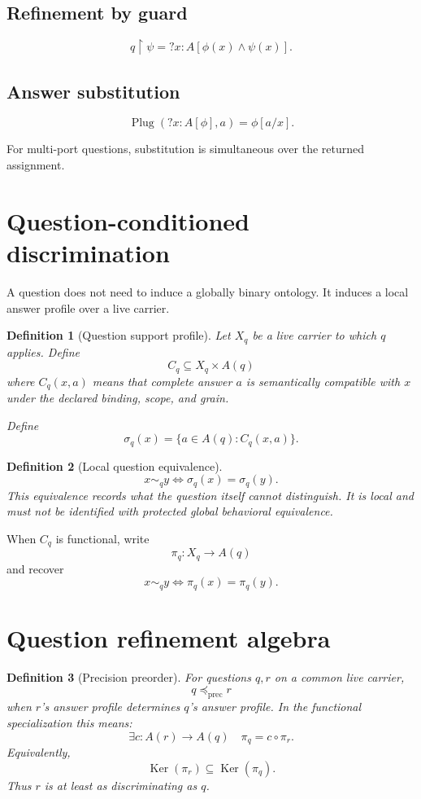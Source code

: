 \documentclass[11pt,oneside]{article}
\newtheorem{definition}{Definition}[section]
\newcommand{\Ker}{\operatorname{Ker}}
\begin{document}
\subsection{Refinement by guard}

\[
\boxed{
q\upharpoonright\psi
=
?x:A[
\phi(x)\land\psi(x)
].
}
\]

\subsection{Answer substitution}

\[
\boxed{
\operatorname{Plug}(?x:A[\phi],a)
=
\phi[a/x].
}
\]

For multi-port questions, substitution is simultaneous over the returned assignment.

\section{Question-conditioned discrimination}

A question does not need to induce a globally binary ontology.  It induces a local answer profile over a live carrier.

\begin{definition}[Question support profile]
Let \(X_q\) be a live carrier to which \(q\) applies.  Define
\[
C_q\subseteq X_q\times A(q)
\]
where \(C_q(x,a)\) means that complete answer \(a\) is semantically compatible with \(x\) under the declared binding, scope, and grain.

Define
\[
\sigma_q(x)
=
\{a\in A(q):C_q(x,a)\}.
\]
\end{definition}

\begin{definition}[Local question equivalence]
\[
\boxed{
x\sim_q y
\iff
\sigma_q(x)=\sigma_q(y).
}
\]
This equivalence records what the question itself cannot distinguish.  It is local and must not be identified with protected global behavioral equivalence.
\end{definition}

When \(C_q\) is functional, write
\[
\pi_q:X_q\to A(q)
\]
and recover
\[
x\sim_q y\iff\pi_q(x)=\pi_q(y).
\]

\section{Question refinement algebra}

\begin{definition}[Precision preorder]
For questions \(q,r\) on a common live carrier,
\[
\boxed{
q\preceq_{\mathrm{prec}}r
}
\]
when \(r\)'s answer profile determines \(q\)'s answer profile.  In the functional specialization this means:
\[
\boxed{
\exists c:A(r)\to A(q)
\quad
\pi_q=c\circ\pi_r.
}
\]
Equivalently,
\[
\Ker(\pi_r)\subseteq\Ker(\pi_q).
\]
Thus \(r\) is at least as discriminating as \(q\).
\end{definition}
\end{document}
